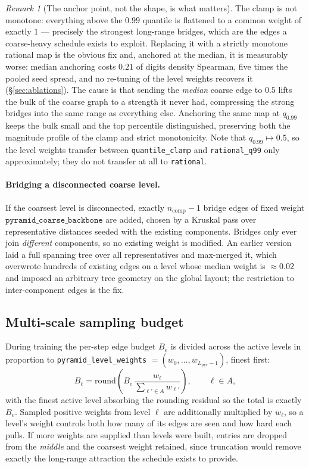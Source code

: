 \documentclass[12pt]{iopart}
\theoremstyle{definition}
\theoremstyle{plain}
\theoremstyle{remark}
\newtheorem{remark}{Remark}
\newcommand{\code}[1]{\texttt{#1}}
\begin{document}
\begin{remark}[The anchor point, not the shape, is what matters]
\label{rem:squash}
The clamp is not monotone: everything above the $0.99$ quantile is flattened to
a common weight of exactly $1$ --- precisely the strongest long-range bridges,
which are the edges a coarse-heavy schedule exists to exploit. Replacing it
with a strictly monotone rational map is the obvious fix and, anchored at the
median, it is measurably worse: median anchoring costs $0.21$ of digits density
Spearman, five times the pooled seed spread, and no re-tuning of the level
weights recovers it (\S\ref{sec:ablations}). The cause is that sending the
\emph{median} coarse edge to $0.5$ lifts the bulk of the coarse graph to a
strength it never had, compressing the strong bridges into the same range as
everything else. Anchoring the same map at $q_{0.99}$ keeps the bulk small and
the top percentile distinguished, preserving both the magnitude profile of the
clamp and strict monotonicity. Note that $q_{0.99}\mapsto 0.5$, so the level
weights transfer between \code{quantile\_clamp} and \code{rational\_q99} only
approximately; they do not transfer at all to \code{rational}.
\end{remark}

\paragraph{Bridging a disconnected coarse level.}
If the coarsest level is disconnected, exactly $n_{\mathrm{comp}}-1$ bridge
edges of fixed weight $\code{pyramid\_coarse\_backbone}$ are added, chosen by a
Kruskal pass over representative distances seeded with the existing components.
Bridges only ever join \emph{different} components, so no existing weight is
modified. An earlier version laid a full spanning tree over all representatives
and max-merged it, which overwrote hundreds of existing edges on a level whose
median weight is $\approx 0.02$ and imposed an arbitrary tree geometry on the
global layout; the restriction to inter-component edges is the fix.

\subsection{Multi-scale sampling budget}
\label{sec:budget}

During training the per-step edge budget $B_e$ is divided across the active
levels in proportion to \code{pyramid\_level\_weights}
$=(w_0,\ldots,w_{L_{\mathrm{pyr}}-1})$, finest first:
\begin{equation}
\label{eq:budget}
B_\ell
=
\mathrm{round}\!\left(B_e\,\frac{w_\ell}{\sum_{\ell'\in A}w_{\ell'}}\right),
\qquad \ell\in A,
\end{equation}
with the finest active level absorbing the rounding residual so the total is
exactly $B_e$. Sampled positive weights from level $\ell$ are additionally
multiplied by $w_\ell$, so a level's weight controls both how many of its edges
are seen and how hard each pulls. If more weights are supplied than levels were
built, entries are dropped from the \emph{middle} and the coarsest weight
retained, since truncation would remove exactly the long-range attraction the
schedule exists to provide.
\end{document}
